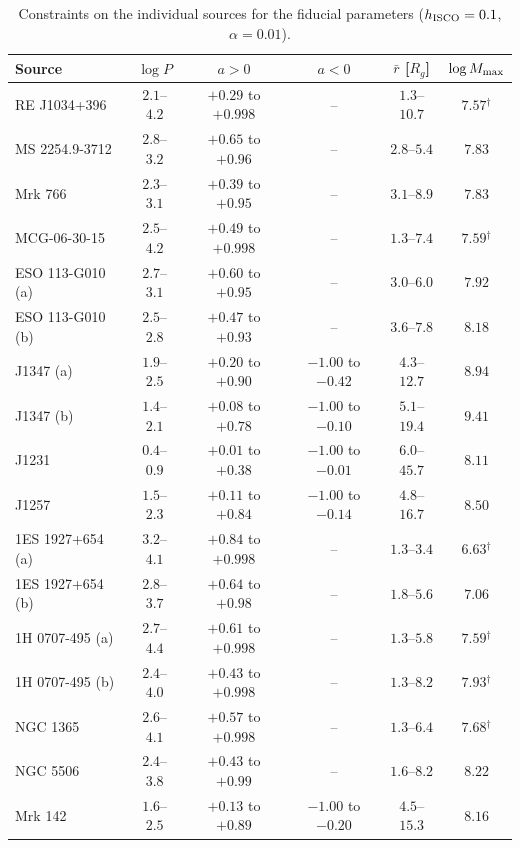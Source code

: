 \begin{table}
\caption{Constraints on the individual sources for the fiducial parameters ($h_\textup{ISCO}=0.1$, $\alpha=0.01$).}
\label{tab:constraints}
\centering
\begin{tabular}{lccccc}
\hline\hline
Source & $\log P$ & $a>0$ & $a<0$ & $\bar r$ [$R_g$] & $\log M_\textup{max}$ \\
\hline
RE J1034+396 & $2.1$--$4.2$ & $+0.29$ to $+0.998$ & -- & $1.3$--$10.7$ & $7.57$$^\dagger$ \\
MS 2254.9-3712 & $2.8$--$3.2$ & $+0.65$ to $+0.96$ & -- & $2.8$--$5.4$ & $7.83$ \\
Mrk 766 & $2.3$--$3.1$ & $+0.39$ to $+0.95$ & -- & $3.1$--$8.9$ & $7.83$ \\
MCG-06-30-15 & $2.5$--$4.2$ & $+0.49$ to $+0.998$ & -- & $1.3$--$7.4$ & $7.59$$^\dagger$ \\
ESO 113-G010 (a) & $2.7$--$3.1$ & $+0.60$ to $+0.95$ & -- & $3.0$--$6.0$ & $7.92$ \\
ESO 113-G010 (b) & $2.5$--$2.8$ & $+0.47$ to $+0.93$ & -- & $3.6$--$7.8$ & $8.18$ \\
J1347 (a) & $1.9$--$2.5$ & $+0.20$ to $+0.90$ & $-1.00$ to $-0.42$ & $4.3$--$12.7$ & $8.94$ \\
J1347 (b) & $1.4$--$2.1$ & $+0.08$ to $+0.78$ & $-1.00$ to $-0.10$ & $5.1$--$19.4$ & $9.41$ \\
J1231 & $0.4$--$0.9$ & $+0.01$ to $+0.38$ & $-1.00$ to $-0.01$ & $6.0$--$45.7$ & $8.11$ \\
J1257 & $1.5$--$2.3$ & $+0.11$ to $+0.84$ & $-1.00$ to $-0.14$ & $4.8$--$16.7$ & $8.50$ \\
1ES 1927+654 (a) & $3.2$--$4.1$ & $+0.84$ to $+0.998$ & -- & $1.3$--$3.4$ & $6.63$$^\dagger$ \\
1ES 1927+654 (b) & $2.8$--$3.7$ & $+0.64$ to $+0.98$ & -- & $1.8$--$5.6$ & $7.06$ \\
1H 0707-495 (a) & $2.7$--$4.4$ & $+0.61$ to $+0.998$ & -- & $1.3$--$5.8$ & $7.59$$^\dagger$ \\
1H 0707-495 (b) & $2.4$--$4.0$ & $+0.43$ to $+0.998$ & -- & $1.3$--$8.2$ & $7.93$$^\dagger$ \\
NGC 1365 & $2.6$--$4.1$ & $+0.57$ to $+0.998$ & -- & $1.3$--$6.4$ & $7.68$$^\dagger$ \\
NGC 5506 & $2.4$--$3.8$ & $+0.43$ to $+0.99$ & -- & $1.6$--$8.2$ & $8.22$ \\
Mrk 142 & $1.6$--$2.5$ & $+0.13$ to $+0.89$ & $-1.00$ to $-0.20$ & $4.5$--$15.3$ & $8.16$ \\

\end{tabular}
\end{table}
